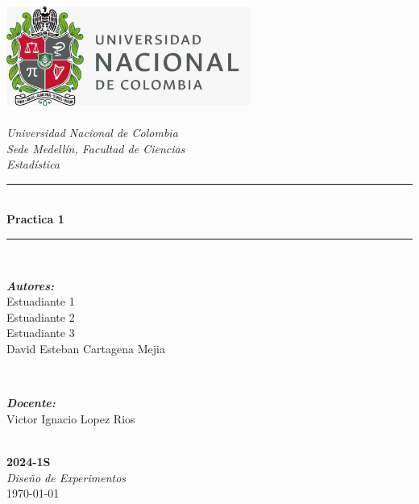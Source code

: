 \begin{titlepage}
\newcommand{\HRule}{\rule{\linewidth}{0.5mm}}
\includegraphics[width=8cm]{Unal.jpeg}\\[0.5cm] 
\center 
\quad\\[1.0cm]
\textsl{\Large Universidad Nacional de Colombia}\\[0.5cm] 
\textsl{\large Sede Medellín, Facultad de Ciencias}\\[0.5cm] 
\textsl{\large Estadística}\\[1.5cm] 
\makeatletter
\HRule \\[0.6cm]
{ \huge \bfseries Practica 1}\\[0.4cm] 
\HRule \\[1.4cm]
\begin{minipage}{0.4\textwidth}
\begin{flushleft} \large
\emph{\textbf{Autores:}}\\
Estuadiante 1 \\
Estuadiante 2 \\
Estuadiante 3 \\
David Esteban Cartagena Mejia\\
\end{flushleft}
\end{minipage}
~
\begin{minipage}{0.4\textwidth}
\begin{flushright} \large
\emph{\textbf{Docente:}} \\
\textup{Victor Ignacio Lopez Rios}
\end{flushright}
\end{minipage}\\[3.2cm]
\makeatother
{\large \textbf{2024-1S}}\\[0.5cm]
{\large \emph{Diseño de Experimentos}}\\[0.6cm]
{\large \today}\\[2cm] 
\vfill 
\end{titlepage}